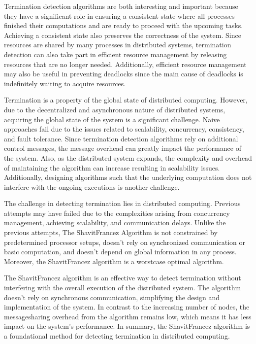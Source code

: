 \documentclass[letterpaper,10pt,english]{sphinxmanual}
\begin{document}
\sphinxAtStartPar
Termination detection algorithms are both interesting and important because they have a significant role in ensuring a consistent state where all processes finished their computations and are ready to proceed with the upcoming tasks. Achieving a consistent state also preserves the correctness of the system. Since resources are shared by many processes in distributed systems, termination detection can also take part in efficient resource management by releasing resources that are no longer needed. Additionally, efficient resource management may  also be useful in preventing deadlocks since the main cause of deadlocks is indefinitely waiting to acquire resources.

\sphinxAtStartPar
Termination is a property of the global state of distributed computing. However, due to the decentralized and asynchronous nature of distributed systems, acquiring the global state of the system is a significant challenge. Naive approaches fail due to the issues related to scalability, concurrency, consistency, and fault tolerance. Since termination detection algorithms rely on additional control messages, the message overhead can greatly impact the performance of the system. Also, as the distributed system expands, the complexity and overhead of maintaining the algorithm can increase resulting in scalability issues. Additionally, designing algorithms such that the underlying computation does not interfere with the ongoing executions is another challenge.

\sphinxAtStartPar
The challenge in detecting termination lies in distributed computing. Previous attempts may have failed due to the complexities arising from concurrency management, achieving scalability, and communication delays. Unlike the previous attempts, The Shavit\sphinxhyphen{}Francez Algorithm is not constrained by predetermined processor setups, doesn’t rely on synchronized communication or basic computation, and doesn’t depend on global information in any process.  Moreover, the Shavit\sphinxhyphen{}Francez algorithm is a worst\sphinxhyphen{}case optimal algorithm.

\sphinxAtStartPar
The Shavit\sphinxhyphen{}Francez algorithm is an effective way to detect termination without interfering with the overall execution of the distributed system. The algorithm doesn’t rely on synchronous communication, simplifying the design and implementation of the system. In contrast to the increasing number of nodes, the message\sphinxhyphen{}sharing overhead from the algorithm remains low, which means it has less impact on the system’s performance. In summary, the Shavit\sphinxhyphen{}Francez algorithm is a foundational method for detecting termination in distributed computing.
\end{document}
